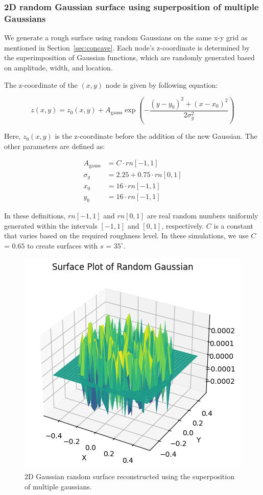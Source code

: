 \documentclass{optica-article}
\begin{document}
\subsubsection{2D random Gaussian surface using superposition of multiple Gaussians}
We generate a rough surface using random Gaussians on the same x-y grid as mentioned in Section~\ref{sec:concave}. Each node's z-coordinate is determined by the superimposition of Gaussian functions, which are randomly generated based on amplitude, width, and location.

The z-coordinate of the $(x, y)$ node is given  by following equation:

\[
z(x, y) = z_0(x, y) + A_{\text{gauss}} \exp \left( -\frac{(y - y_0)^2 + (x - x_0)^2}{2\sigma_g^2} \right)
\]

Here, $z_0(x, y)$ is the z-coordinate before the addition of the new Gaussian. The other parameters are defined as:

\[
\begin{aligned}
A_{\text{gauss}} &= C \cdot rn[-1, 1] \\
\sigma_g &= 2.25 + 0.75 \cdot rn[0, 1] \\
x_0 &= 16 \cdot rn[-1, 1] \\
y_0 &= 16 \cdot rn[-1, 1]
\end{aligned}
\]

In these definitions, $rn[-1, 1]$ and $rn[0, 1]$ are real random numbers uniformly generated within the intervals $[-1, 1]$ and $[0, 1]$, 
respectively. $C$ is a constant that varies based on the required roughness level.
 In these simulations, we use $C$ = $0.65$ to create surfaces with 
 $s$ = $35^\circ$.

 \begin{figure}[H]
	\centering
	\includegraphics[scale=0.45]{./Figures/gaussian_c.png}
	\caption{2D Gaussian random surface reconstructed using the superposition of multiple gaussians.}
	\label{fig:gaussian_c}	
 \end{figure}
\end{document}
